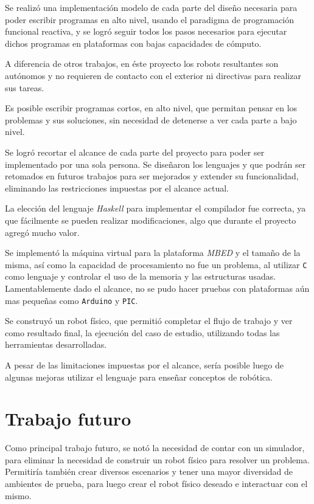 

  Se realizó una implementación modelo de cada parte del diseño
necesaria para poder escribir programas en alto nivel, usando
el paradigma de programación funcional reactiva, y se logró
seguir todos los pasos necesarios para ejecutar dichos programas
en plataformas con bajas capacidades de cómputo.

  A diferencia de otros trabajos, en éste proyecto los robots
resultantes son autónomos y no requieren de contacto con el
exterior ni directivas para realizar sus tareas.

  Es posible escribir programas cortos, en alto nivel, que permitan
pensar en los problemas y sus soluciones, sin necesidad de detenerse
a ver cada parte a bajo nivel.

  Se logró recortar el alcance de cada parte del proyecto para
poder ser implementado por una sola persona.
  Se diseñaron los lenguajes \frob{} y \alf{} que podrán ser
retomados en futuros trabajos para ser mejorados y extender
su funcionalidad, eliminando las restricciones impuestas
por el alcance actual.

  La elección del lenguaje \textit{Haskell} para implementar el
compilador fue correcta, ya que fácilmente se pueden realizar
modificaciones, algo que durante el proyecto agregó mucho valor.

  Se implementó la máquina virtual para la plataforma \textit{MBED}
y el tamaño de la misma, así como la capacidad de procesamiento no
fue un problema, al utilizar \texttt{C} como lenguaje y controlar
el uso de la memoria y las estructuras usadas.
  Lamentablemente dado el alcance, no se pudo hacer pruebas
con plataformas aún mas pequeñas como \texttt{Arduino} y \texttt{PIC}.

  Se construyó un robot físico, que permitió completar el flujo
de trabajo y ver como resultado final, la ejecución del caso de
estudio, utilizando todas las herramientas desarrolladas.

  A pesar de las limitaciones impuestas por el alcance, sería
posible luego de algunas mejoras utilizar el lenguaje para enseñar
conceptos de robótica.

\section{Trabajo futuro}

  Como principal trabajo futuro, se notó la necesidad de contar con
un simulador, para eliminar la necesidad de construir un robot físico
para resolver un problema. Permitiría también crear diversos escenarios
y tener una mayor diversidad de ambientes de prueba, para luego
crear el robot físico deseado e interactuar con el mismo.

